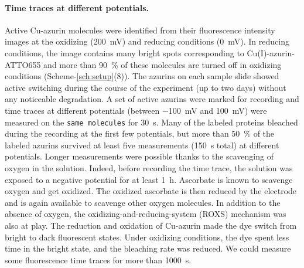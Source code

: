 \paragraph*{Time traces at different potentials.}
Active Cu-azurin molecules were identified from their fluorescence intensity images at the oxidizing (\SI{200}{\mV}) and reducing conditions (\SI{0}{\mV}).
In reducing conditions, the image contains many bright spots corresponding to Cu(I)-azurin-ATTO655 and more than \SI{90}{\percent} of these molecules are turned off in oxidizing conditions 
(Scheme-\ref{sch:setup}(8)).
The azurins on each sample slide showed active switching during the course of the experiment (up to two days) without any noticeable degradation.
A set of active azurins were marked for recording and time traces at different potentials (between \SI{-100}{\mV} and \SI{100}{\mV}) were measured on the \texttt{same molecules} 
for \SI{30}{\s}.
Many of the labeled proteins bleached during the recording at the first few potentials, but more than \SI{50}{\percent} of the labeled azurins survived at least five measurements (\SI{150}{\s}  total) at different potentials.
Longer measurements were possible thanks to the scavenging of oxygen in the solution.
Indeed, before recording the time trace, the solution was exposed to a negative potential for at least \SI{1}{\hour}.
Ascorbate is known to  scavenge oxygen\cite{dave1997effectiveness} and get oxidized.
The oxidized ascorbate is then reduced by the electrode and is again available to scavenge other oxygen molecules.
In addition to the absence of oxygen, the  oxidizing-and-reducing-system (ROXS) mechanism was also at play.\cite{cordes2009on}
The reduction and oxidation of Cu-azurin made the dye switch from bright to dark fluorescent states. Under oxidizing conditions, the dye spent less time in the bright state, and the bleaching rate was reduced.
We could measure some fluorescence time traces for more than \SI{1000}{\s}.\\
